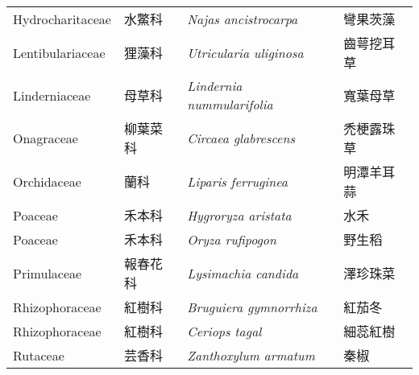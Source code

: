 {\begin{longtable}{p{3cm}p{2cm}p{5cm}p{3cm}}
    Hydrocharitaceae & 水鱉科 & \textit{Najas ancistrocarpa}  \index{Najas@\textit{Najas}!ancistrocarpa@\textit{ancistrocarpa}}   & 彎果茨藻 \index{彎果茨藻} \\
    Lentibulariaceae & 狸藻科 & \textit{Utricularia uliginosa}  \index{Utricularia@\textit{Utricularia}!uliginosa@\textit{uliginosa}} & 齒萼挖耳草 \index{齒萼挖耳草} \\
    Linderniaceae & 母草科 & \textit{Lindernia nummularifolia}  \index{Lindernia@\textit{Lindernia}!nummularifolia@\textit{nummularifolia}} & 寬葉母草 \index{寬葉母草} \\
    Onagraceae & 柳葉菜科 & \textit{Circaea glabrescens}  \index{Circaea@\textit{Circaea}!glabrescens@\textit{glabrescens}}       & 禿梗露珠草 \index{禿梗露珠草} \\
    Orchidaceae & 蘭科 & \textit{Liparis ferruginea}  \index{Liparis@\textit{Liparis}!ferruginea@\textit{ferruginea}}           & 明潭羊耳蒜 \index{明潭羊耳蒜} \\
    Poaceae & 禾本科 & \textit{Hygroryza aristata}  \index{Hygroryza@\textit{Hygroryza}!aristata@\textit{aristata}}             & 水禾 \index{水禾} \\
    Poaceae & 禾本科 & \textit{Oryza rufipogon}  \index{Oryza@\textit{Oryza}!rufipogon@\textit{rufipogon}}                & 野生稻 \index{野生稻} \\
    Primulaceae & 報春花科 & \textit{Lysimachia candida}  \index{Lysimachia@\textit{Lysimachia}!candida@\textit{candida}}       & 澤珍珠菜 \index{澤珍珠菜} \\
    Rhizophoraceae & 紅樹科 & \textit{Bruguiera gymnorrhiza}  \index{Bruguiera@\textit{Bruguiera}!gymnorrhiza@\textit{gymnorrhiza}}   & 紅茄冬 \index{紅茄冬} \\
    Rhizophoraceae & 紅樹科 & \textit{Ceriops tagal}  \index{Ceriops@\textit{Ceriops}!tagal@\textit{tagal}}           & 細蕊紅樹 \index{細蕊紅樹} \\
    Rutaceae & 芸香科 & \textit{Zanthoxylum armatum}  \index{Zanthoxylum@\textit{Zanthoxylum}!armatum@\textit{armatum}}           & 秦椒 \index{秦椒} \\
    \bottomrule
    \end{longtable}
}